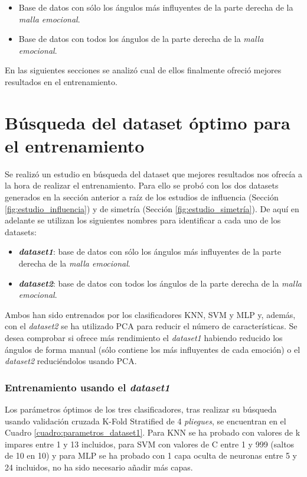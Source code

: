 \begin{itemize}
    \item Base de datos con sólo los ángulos más influyentes de la parte derecha de la \textit{malla emocional}.
    \item Base de datos con todos los ángulos de la parte derecha de la \textit{malla emocional}.
\end{itemize}

En las siguientes secciones se analizó cual de ellos finalmente ofreció mejores resultados en el entrenamiento.

\section{Búsqueda del dataset óptimo para el entrenamiento}
\label{sec:estudio_dataset_optimo}

Se realizó un estudio en búsqueda del dataset que mejores resultados nos ofrecía a la hora de realizar el entrenamiento. Para ello se probó con los dos datasets generados en la sección anterior a raíz de los estudios de influencia (Sección \ref{fig:estudio_influencia}) y de simetría (Sección \ref{fig:estudio_simetría}). De aquí en adelante se utilizan los siguientes nombres para identificar a cada uno de los datasets:

\begin{itemize}
    \item \textbf{\textit{dataset1}}: base de datos con sólo los ángulos más influyentes de la parte derecha de la \textit{malla emocional}.
    \item \textbf{\textit{dataset2}}: base de datos con todos los ángulos de la parte derecha de la \textit{malla emocional}.
\end{itemize}

Ambos han sido entrenados por los clasificadores KNN, SVM y MLP y, además, con el \textit{dataset2} se ha utilizado PCA para reducir el número de características. Se desea comprobar si ofrece más rendimiento el \textit{dataset1} habiendo reducido los ángulos de forma manual (sólo contiene los más influyentes de cada emoción) o el \textit{dataset2} reduciéndolos usando PCA.

\subsubsection{Entrenamiento usando el \textit{dataset1}}

Los parámetros óptimos de los tres clasificadores, tras realizar su búsqueda usando validación cruzada K-Fold Stratified de 4 \textit{pliegues}, se encuentran en el Cuadro \ref{cuadro:parametros_dataset1}. Para KNN se ha probado con valores de k impares entre 1 y 13 incluidos, para SVM con valores de C entre 1 y 999 (saltos de 10 en 10) y para MLP se ha probado con 1 capa oculta de neuronas entre 5 y 24 incluidos, no ha sido necesario añadir más capas.\\

